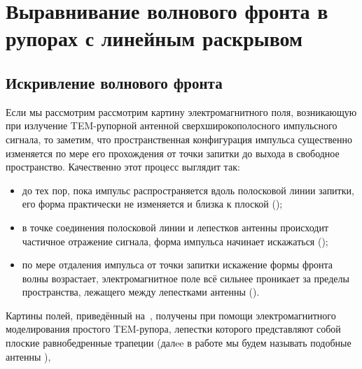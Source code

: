 \chapter{Выравнивание волнового фронта в рупорах с линейным раскрывом}

\section{Искривление волнового фронта}

Если мы рассмотрим рассмотрим картину электромагнитного поля,
возникающую при излучение TEM-рупорной антенной сверхширокополосного
импульсного сигнала, то заметим, что пространственная конфигурация
импульса существенно изменяется по мере его прохождения от точки
запитки до выхода в свободное пространство.
Качественно этот процесс выглядит так:
%
\begin{itemize}
  \item
    до тех пор, пока импульс распространяется вдоль полосковой
    линии запитки, его форма практически не изменяется и близка
    к плоской ();
  \item
    в точке соединения полосковой линии и лепестков антенны
    происходит частичное отражение сигнала, форма импульса
    начинает искажаться ();
  \item
    по мере отдаления импульса от точки запитки искажение формы
    фронта волны возрастает, электромагнитное поле всё сильнее
    проникает за пределы пространства, лежащего между лепестками
    антенны ().
\end{itemize}

Картины полей, приведённый на~,
получены при помощи электромагнитного моделирования простого
TEM-рупора, лепестки которого представляют собой плоские
равнобедренные трапеции (далee в работе мы будем называть подобные
антенны ), 

